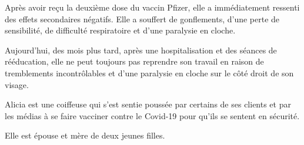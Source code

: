 Après avoir reçu la deuxième dose du vaccin Pfizer, elle a immédiatement
ressenti des effets secondaires négatifs. Elle a souffert de gonflements, d'une
perte de sensibilité, de difficulté respiratoire et d'une paralysie en cloche.

Aujourd'hui, des mois plus tard, après une hospitalisation et des séances de
rééducation, elle ne peut toujours pas reprendre son travail en raison de
tremblements incontrôlables et d'une paralysie en cloche sur le côté droit de
son visage.

Alicia est une coiffeuse qui s'est sentie poussée par certains de ses clients et
par les médias à se faire vacciner contre le Covid-19 pour qu'ils se sentent en
sécurité.

Elle est épouse et mère de deux jeunes filles.

